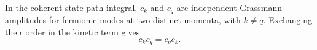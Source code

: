 \documentclass{article}
\begin{document}
In the coherent-state path integral, $c_k$ and $c_q$ are independent
Grassmann amplitudes for fermionic modes at two distinct momenta, with
$k\neq q$.  Exchanging their order in the kinetic term gives
\begin{equation}
c_k c_q = c_q c_k .
\label{eq:fermion-mode-exchange}
\end{equation}
\end{document}
